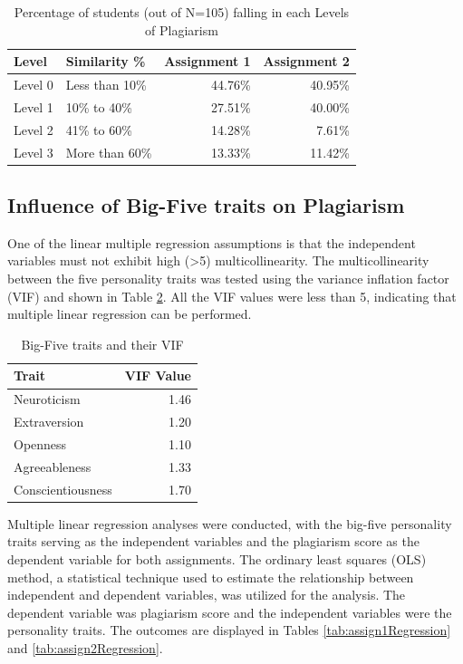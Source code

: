 \begin{table}[h]
  \centering
  \caption{Percentage of students (out of N=105) falling in each Levels of Plagiarism \label{tab:levelsPlagiarism}}
  \vspace{-12pt}
  \begin{tabular}{p{1cm}p{2cm}rr}
    \toprule
    Level & Similarity \% & Assignment 1 & Assignment 2 \\\midrule
    Level 0 & Less than 10\% & 44.76\% & 40.95\% \\
    Level 1 & 10\% to 40\% & 27.51\% & 40.00\%  \\
    Level 2 & 41\% to 60\% & 14.28\% & 7.61\% \\
    Level 3 & More than 60\% &13.33\% & 11.42\% \\ \bottomrule
  \end{tabular}\vspace{-8pt}
\end{table}

\subsection{Influence of Big-Five traits on Plagiarism}

One of the linear multiple regression assumptions is that the independent variables must not exhibit high (>5) multicollinearity. The multicollinearity between the five personality traits was tested using the variance inflation factor (VIF) and shown in Table \ref{tab:VIF}. All the VIF values were less than 5, indicating that multiple linear regression can be performed. 

\begin{table}[h]
  \centering
  \caption{Big-Five traits and their VIF\label{tab:VIF}}
    \vspace{-12pt}
  \begin{tabular}{p{2cm}r}
    \toprule
    Trait & VIF Value \\\midrule
    Neuroticism & 1.46 \\
    Extraversion & 1.20 \\
    Openness & 1.10\\
    Agreeableness & 1.33 \\ 
    Conscientiousness & 1.70  \\\bottomrule
  \end{tabular}\vspace{-4pt}
\end{table}

Multiple linear regression analyses were conducted, with the big-five personality traits serving as the independent variables and the plagiarism score as the dependent variable for both assignments. The ordinary least squares (OLS) method, a statistical technique used to estimate the relationship between independent and dependent variables, was utilized for the analysis. The dependent variable was plagiarism score and the independent variables were the personality traits. The outcomes are displayed in Tables \ref{tab:assign1Regression} and \ref{tab:assign2Regression}. 

